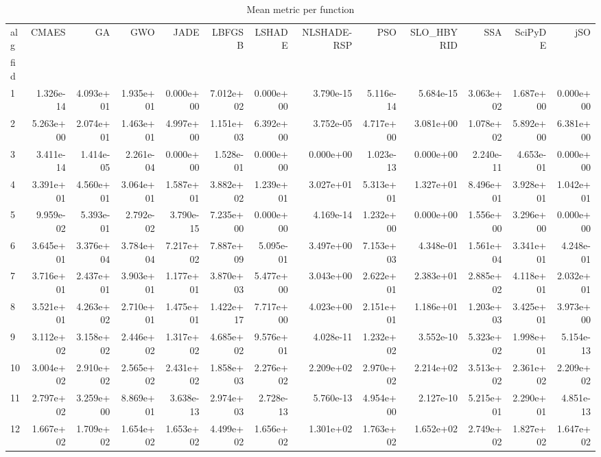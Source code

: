 \begin{table}
\caption{Mean metric per function}
\label{tab:mean_all}
\begin{tabular}{lrrrrrrrrrrrr}
\toprule
alg & CMAES & GA & GWO & JADE & LBFGSB & LSHADE & NLSHADE-RSP & PSO & SLO_HBYRID & SSA & SciPyDE & jSO \\
fid &  &  &  &  &  &  &  &  &  &  &  &  \\
\midrule
1 & 1.326e-14 & 4.093e+01 & 1.935e+01 & 0.000e+00 & 7.012e+02 & 0.000e+00 & 3.790e-15 & 5.116e-14 & 5.684e-15 & 3.063e+02 & 1.687e+00 & 0.000e+00 \\
2 & 5.263e+00 & 2.074e+01 & 1.463e+01 & 4.997e+00 & 1.151e+03 & 6.392e+00 & 3.752e-05 & 4.717e+00 & 3.081e+00 & 1.078e+02 & 5.892e+00 & 6.381e+00 \\
3 & 3.411e-14 & 1.414e-05 & 2.261e-04 & 0.000e+00 & 1.528e-01 & 0.000e+00 & 0.000e+00 & 1.023e-13 & 0.000e+00 & 2.240e-11 & 4.653e-01 & 0.000e+00 \\
4 & 3.391e+01 & 4.560e+01 & 3.064e+01 & 1.587e+01 & 3.882e+02 & 1.239e+01 & 3.027e+01 & 5.313e+01 & 1.327e+01 & 8.496e+01 & 3.928e+01 & 1.042e+01 \\
5 & 9.959e-02 & 5.393e-01 & 2.792e-02 & 3.790e-15 & 7.235e+00 & 0.000e+00 & 4.169e-14 & 1.232e+00 & 0.000e+00 & 1.556e+00 & 3.296e+00 & 0.000e+00 \\
6 & 3.645e+01 & 3.376e+04 & 3.784e+04 & 7.217e+02 & 7.887e+09 & 5.095e-01 & 3.497e+00 & 7.153e+03 & 4.348e-01 & 1.561e+04 & 3.341e+01 & 4.248e-01 \\
7 & 3.716e+01 & 2.437e+01 & 3.903e+01 & 1.177e+01 & 3.870e+03 & 5.477e+00 & 3.043e+00 & 2.622e+01 & 2.383e+01 & 2.885e+02 & 4.118e+01 & 2.032e+01 \\
8 & 3.521e+01 & 4.263e+02 & 2.710e+01 & 1.475e+01 & 1.422e+17 & 7.717e+00 & 4.023e+00 & 2.151e+01 & 1.186e+01 & 1.203e+03 & 3.425e+01 & 3.973e+00 \\
9 & 3.112e+02 & 3.158e+02 & 2.446e+02 & 1.317e+02 & 4.685e+02 & 9.576e+01 & 4.028e-11 & 1.232e+02 & 3.552e-10 & 5.323e+02 & 1.998e+01 & 5.154e-13 \\
10 & 3.004e+02 & 2.910e+02 & 2.565e+02 & 2.431e+02 & 1.858e+03 & 2.276e+02 & 2.209e+02 & 2.970e+02 & 2.214e+02 & 3.513e+02 & 2.361e+02 & 2.209e+02 \\
11 & 2.797e+02 & 3.259e+00 & 8.869e+01 & 3.638e-13 & 2.974e+03 & 2.728e-13 & 5.760e-13 & 4.954e+00 & 2.127e-10 & 5.215e+01 & 2.290e+01 & 4.851e-13 \\
12 & 1.667e+02 & 1.709e+02 & 1.654e+02 & 1.653e+02 & 4.499e+02 & 1.656e+02 & 1.301e+02 & 1.763e+02 & 1.652e+02 & 2.749e+02 & 1.827e+02 & 1.647e+02 \\
\bottomrule
\end{tabular}
\end{table}
